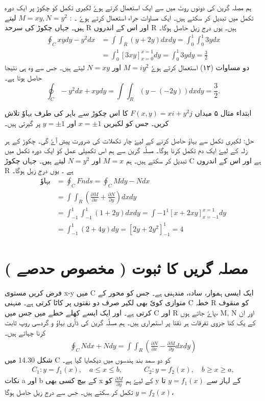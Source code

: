 \documentclass{book}
\begin{document}
\begin{urdufont}
ہم مصلہ گرین کی دونوں روٹ میں سے ایک استعمال کرتے ہوےٗ لکیری تکمل کو چکوڑ پر ایک دورہ تکمل میں تبدیل کر سکتے ہیں۔  ایک مساوات جراء استعمال کرتے ہوےٗ ۔ 
: $M = xy, N = y^2$
لیتے ہیں۔ جہاں چکوڑ کی سرحد
R
اور اس کے اندروں
R
   ہیں۔ یوں درج زیل حاصل ہوگا۔
\begin{align*}
    \oint_C xy dy - y^2 dx &= \int \int_R (y + 2y) dx dy = \int_0^1 \int_0^1 3y dx \\
    &= \int_0^1 [3xy]_{x=0}^{x=1} dy = \int_0^1 3y dy = \frac{3}{2}
\end{align*}
دو مساوات 
(۱۲) 
استعمال کرتے ہوےٗ
$M = iy^2$
اور
$N = xy$
لیتے ہیں۔ جس سے وہ ہی نتیجا حاصل ہوتا ہے۔
$$ \oint_C -y^2 dx + xy dy = \int \int_R (y - (-2y)) dx dy = \frac{3}{2}. $$

ابتداء مثال ۵ 
میداں
$ F(x,y) = x i + y^2 j$
کا اس چکوڑ سے باہر کی طرف بہاوٗ تلاش کریں۔ جس کو لکیریں 
$ x = \pm 1$
اور 
$ y = \pm 1$
پر گیرتی ہیں۔

حل:
لکیری تکمل سے بہاوٗ حاصل کرنے کے لیےٗ چار تکملات کی ضرورت پیش آےٗ گی۔
  چکوڑ کے ہر زلہ کے لیےٗ  
ایک دم تکمل کرنا ہوگا۔  مسلٗہ گرین سے ہم اس تکمیلی عمل کو ایک دورہ تکمل میں تبدیل کر سکتے ہیں۔ ہم 
$M = x$
اور 
$N = y^2$
لیتے ہیں۔ جہاں چکوڑ
C
ہے اور اس کے اندروں
R
  ہے ۔
یوں درج زیل ہوگا۔
\begin{align*}
    \text{بہاوٗ} &= \oint_C F \dot n ds = \oint_C M dy - N dx \\
    &= \int \int_R (\frac{\partial M}{\partial x} + \frac{\partial N}{\partial y}) dx dy\\
    &= \int_{-1}^{1} \int_{-1}^{1} (1 + 2y) dx dy = \int{-1}^{1} [x + 2xy]_{x = -1}^{x = 1} dy \\
    &= \int_{-1}^{1} (2 + 4y) dy = [2y + 2y^2]_{-1}^{1} = 4
\end{align*}
\section{ ( مخصوص حدصے ) مصلہ گریں کا ثبوت}
فرض کریں مستوی
x-y
میں 
C
 ایک ایسی ہموار، سادہ، مندہنی ہے۔ جس کو محور کے متوازی کویٗ بھی لکیر صرف دو نقتوں پر کاٹا کرتی ہے۔ منہنی 
C
 خطہ 
R
 کو 
منقوف کرتی ہے۔
اور ایک ایسے کھلے خطے میں جس میں 
C
اور 
R
پاےٗ جاتے ہوں، 
M, N
اور ان کے یک کنا جزوی تفرقات ہر نقتا پر استمراری ہیں۔ ہم مسلٗہ گرین کی ڈاٗری بہاوٗ و گردسی روپ ثابت کرنا چہاتے ہیں۔ 
\begin{align*}
    \oint_C N dx + N dy = \int \int_R (\frac{\partial N}{\partial x} - \frac{\partial M}{\partial y} dx dy)
\end{align*}
شکل 
14.30
میں 
C
کو دو سمد بند ہندسوں میں دیکھایا گیا ہے۔ 
\begin{align*}
    C_1: y = f_1(x), \quad  a \leq x \leq b, \quad\quad\quad C_2:  y = f_2(x), \quad  b \geq x \geq a,
\end{align*}
نکات
a
اور 
b
کے بیچ کسی بھی 
x
کے لیےٗ ہم 
$\frac{\partial M}{\partial y}$
کو 
y
 کے لہاز سے 
$ y = f_1(x)$
تا
$  y = f_2(x)$
 تکمل کر سکتے ہیں۔ جس سے درج زیل حاصل ہوگا،


\end{urdufont}
\end{document}
